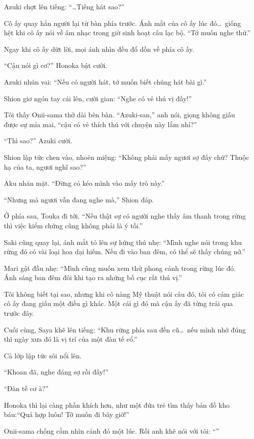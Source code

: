 \documentclass[../main.tex]{subfiles}
\begin{document}
Azuki chợt lên tiếng: ``\dots Tiếng hát sao?''

Cô ấy quay hẳn người lại từ bàn phía trước. Ánh mắt của cô ấy lúc đó\dots\ giống hệt khi cô ấy nói về âm nhạc trong giờ sinh hoạt câu lạc bộ. ``Tớ muốn nghe thử.''

Ngay khi cô ấy dứt lời, mọi ánh nhìn đều đổ dồn về phía cô ấy.

``Cậu nói gì cơ?'' Honoka bật cười.

Azuki nhún vai: ``Nếu có người hát, tớ muốn biết chúng hát bài gì.''

Shion giơ ngón tay cái lên, cười gian: ``Nghe có vẻ thú vị đấy!''

Tôi thấy Onii-sama thở dài bên bàn. ``Azuki-san,'' anh nói, giọng không giấu được sự mỉa mai, ``cậu có vẻ thích thú với chuyện này lắm nhỉ?''

``Thì sao?'' Azuki cười.

Shion lập tức chen vào, nhoẻn miệng: ``Không phải mấy ngươi sợ đấy chứ? Thuộc hạ của ta, ngươi nghĩ sao?''

Aku nhăn mặt. ``Đừng có kéo mình vào mấy trò này.''

``Nhưng mà ngươi vẫn đang nghe mà,'' Shion đáp.

Ở phía sau, Touka đi tới. ``Nếu thật sự có người nghe thấy âm thanh trong rừng thì việc kiểm chứng cũng không phải là ý tồi.''

Saki cũng quay lại, ánh mắt tỏ lên sự hứng thú nhẹ: ``Mình nghe nói trong khu rừng đó có vài loại hoa dại hiếm. Nếu đi vào ban đêm, có thể sẽ thấy chúng nở.''

Mari gật đầu nhẹ: ``Mình cũng muốn xem thử phong cảnh trong rừng lúc đó. Ánh sáng ban đêm đôi khi tạo ra những bố cục rất thú vị.''

Tôi không biết tại sao, nhưng khi cô nàng Mỹ thuật nói câu đó, tôi có cảm giác cô ấy đang giấu một điều gì khác. Một cái gì đó mà cậu ấy đã từng trải qua trước đây.

Cuối cùng, Saya khẽ lên tiếng: ``Khu rừng phía sau đền cũ\dots\ nếu mình nhớ đúng thì ngày xưa đó là vị trí của một đàn tế cổ.''

Cả lớp lập tức sôi nổi lên.

``Khoan đã, nghe đáng sợ rồi đấy!''

``Đàn tế cơ à?''

Honoka thì lại càng phấn khích hơn, như một đứa trẻ tìm thấy bản đồ kho báu:``Quá hợp luôn! Tớ muốn đi bây giờ!''

Onii-sama chống cằm nhìn cảnh đó một lúc. Rồi anh khẽ nói với tôi: ``''
\end{document}
